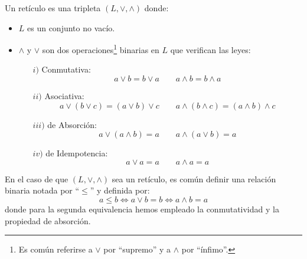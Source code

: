 \begin{definicion}[Retículo]
    Un retículo es una tripleta $(L, \lor, \land)$ donde:
    \begin{itemize}
        \item $L$ es un conjunto no vacío.
        \item $\land$ y $\lor$ son dos operaciones\footnote{Es común referirse a $\lor$ por ``supremo'' y a $\land$ por ``ínfimo''.} binarias en $L$ que verifican las leyes:
            \begin{enumerate}
                \item[$i)$] Conmutativa:
                    \begin{equation*}
                        a\lor b = b\lor a \qquad a\land b = b\land a 
                    \end{equation*}
                \item[$ii)$] Asociativa:
                    \begin{equation*}
                        a\lor (b\lor c) = (a\lor b)\lor c \qquad a\land (b\land c) = (a\land b)\land c 
                    \end{equation*}
                \item[$iii)$] de Absorción: 
                    \begin{equation*}
                        a\lor (a\land b) = a \qquad a\land (a\lor b) = a 
                    \end{equation*}
                \item[$iv)$] de Idempotencia:
                    \begin{equation*}
                        a\lor a = a \qquad a\land a = a
                    \end{equation*}
            \end{enumerate}
    \end{itemize}
    En el caso de que $(L,\lor, \land)$ sea un retículo, es común definir una relación binaria notada por ``$\leq$'' y definida por:
    \begin{equation*}
        a\leq b \Longleftrightarrow a\lor b = b\Longleftrightarrow
        a\land b = a
    \end{equation*}
    donde para la segunda equivalencia hemos empleado la conmutatividad y la propiedad de absorción.
\end{definicion}

